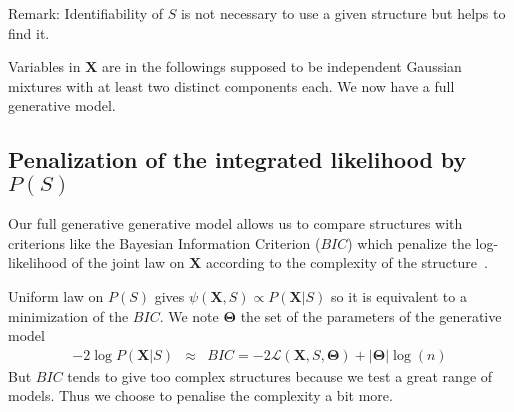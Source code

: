 \documentclass[11pt,a4paper]{article}
\begin{document}
		Remark:  Identifiability of $S$ is not necessary to use a given structure but helps to find it.

		Variables in $\boldsymbol{X}$ are in the followings supposed to be independent Gaussian mixtures with at least two distinct components each. 
	We now have a full generative model.
	
	\subsection{Penalization of the integrated likelihood by $P(S)$} \label{compstruct}

  Our full generative generative model allows us to compare structures with criterions like the Bayesian Information Criterion ($BIC$) which penalize the log-likelihood of the joint law on $\boldsymbol{X}$ according to the complexity of the structure~\cite{BIChuard}. 

Uniform law on $P(S)$ gives $\psi(\boldsymbol{X},S)\propto P(\boldsymbol{X}|S)$ so it is equivalent to a minimization of the $BIC$.
	We note $\boldsymbol{\Theta}$ the set of the parameters of the generative model
	\begin{eqnarray}
		-2\log P(\boldsymbol{X}|S)&\approx & BIC=-2\mathcal{L}(\boldsymbol{X},S,\boldsymbol{\Theta})+|\boldsymbol{\Theta}|\log(n)  
	\end{eqnarray}
	But $BIC$ tends to give too complex structures because we test a great range of models. Thus we choose to penalise the complexity a bit more.
	
\end{document}
